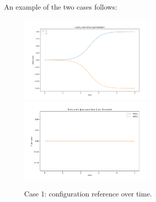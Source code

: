 An example of the two cases follows:

\begin{figure}[H]
  \centering
  \includegraphics[width=0.6\textwidth]{pictures/Figure_1_posizione_smooth}\hfill
  \includegraphics[width=0.6\textwidth]{pictures/Figure_2_posizione_smooth}\hfill
  \caption{Case 1: configuration reference over time.}
  \label{fig:Reference trajectory}
\end{figure}

